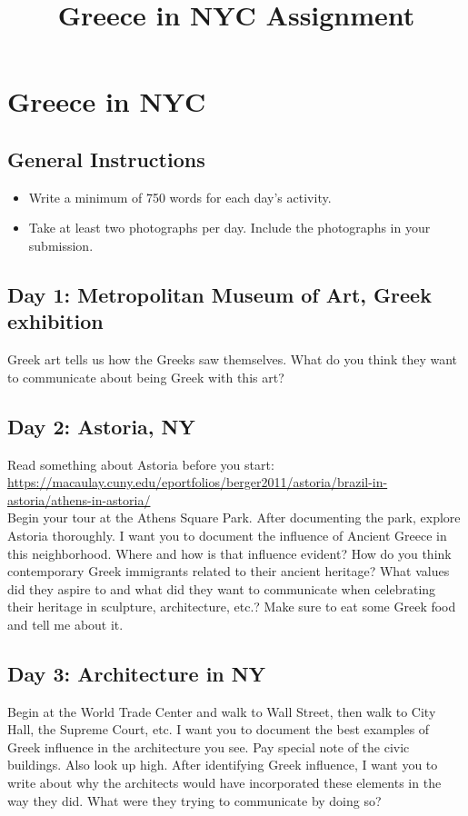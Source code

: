 \documentclass{article}
\title{Greece in NYC Assignment}
\begin{document}
\section*{Greece in NYC}
\subsection*{General Instructions}
\begin{itemize}
\item  Write  a minimum of 750 words for each day's activity. 
\item Take at least two photographs per day. Include the photographs in your submission. 
\end{itemize}

\subsection*{Day 1: Metropolitan  Museum  of  Art,  Greek  exhibition}
Greek  art  tells  us  how  the  Greeks  saw  themselves.  What  do  you  think  they  want  to  communicate  about  being  Greek  with  this  art?  

\subsection*{Day  2: Astoria,  NY}
Read  something  about  Astoria before you start: \url{https://macaulay.cuny.edu/eportfolios/berger2011/astoria/brazil-in-astoria/athens-in-astoria/}\\

Begin your tour at the Athens  Square  Park.  After documenting  the  park, explore Astoria thoroughly. I  want  you  to  document  the  influence  of  Ancient  Greece  in  this  neighborhood.  Where  and  how  is  that  influence  evident?  How  do  you  think  contemporary  Greek  immigrants  related  to  their  ancient  heritage?  What  values  did  they  aspire  to  and  what  did  they  want  to  communicate  when  celebrating  their  heritage  in  sculpture,  architecture,  etc.?  Make  sure  to  eat  some  Greek  food  and  tell  me  about  it.    



\subsection*{Day  3:  Architecture in NY}

Begin  at  the  World  Trade  Center  and  walk  to  Wall  Street,  then  walk  to  City  Hall,  the  Supreme  Court,  etc.  I  want  you  to  document  the  best  examples  of  Greek  influence  in  the  architecture  you  see.  Pay  special  note  of  the  civic  buildings.  Also  look  up  high.  After  identifying  Greek  influence,  I  want  you  to  write  about  why  the  architects  would  have  incorporated  these  elements  in  the  way  they  did.  What  were  they  trying  to  communicate  by  doing  so? 
\end{document}
